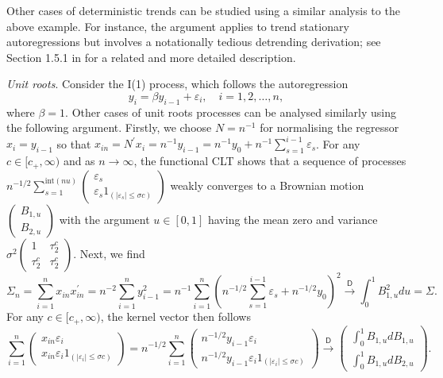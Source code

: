 \documentclass[11pt, letterpaper]{article}
\numberwithin{algorithm}{section}
\numberwithin{assumption}{section}
\numberwithin{lemma}{section}
\numberwithin{theorem}{section}
\numberwithin{corollary}{section}
\numberwithin{remark}{section}
\numberwithin{equation}{section}
\numberwithin{figure}{section}
\numberwithin{table}{section}
\begin{document}
Other cases of deterministic trends can be studied using a similar analysis to the above example. For instance, the argument applies to trend stationary autoregressions but involves a notationally tedious detrending derivation; see Section 1.5.1 in \cite{johansen2009analysis} for a related and more detailed description.

\emph{Unit roots}. Consider the I(1) process, which follows the autoregression
\begin{equation*}
y_{i} = \beta y_{i - 1} + \varepsilon_{i}, \quad i = 1, 2, \ldots, n,
\end{equation*}
where $\beta = 1$. Other cases of unit roots processes can be analysed similarly using the following argument. Firstly, we choose $N = n^{-1}$ for normalising the regressor $x_{i} = y_{i - 1}$ so that $x_{in} = N^{\prime} x_{i} = n^{-1} y_{i - 1} = n^{-1} y_{0} + n^{-1} \sum_{s = 1}^{i - 1} \varepsilon_{s}$. For any $c \in [c_{+}, \infty)$ and as $n \to \infty$, the functional CLT shows that a sequence of processes
$
n^{-1/2} \sum_{s = 1}^{\mathrm{int}(nu)}
\begin{pmatrix}
\varepsilon_{s} \\
\varepsilon_{s} 1_{(|\varepsilon_{s}| \le \sigma c)}
\end{pmatrix}
$
weakly converges to a Brownian motion
$
\begin{pmatrix}
B_{1, u} \\
B_{2, u}
\end{pmatrix}
$ with the argument $u \in [0, 1]$ having the mean zero and variance
$
\sigma^{2}
\begin{pmatrix}
1 & \tau_{2}^{c} \\
\tau_{2}^{c} & \tau_{2}^{c}
\end{pmatrix}
$.
Next, we find
\begin{equation*}
\Sigma_{n} = \sum_{i = 1}^{n} x_{in} x_{in}^{\prime} = n^{-2} \sum_{i = 1}^{n} y_{i - 1}^{2} = n^{-1} \sum_{i = 1}^{n} (n^{-1/2} \sum_{s = 1}^{i - 1} \varepsilon_{s} + n^{-1/2} y_{0})^{2} \overset{\mathsf{D}}{\to} \int_{0}^{1} B_{1, u}^{2} du = \Sigma.
\end{equation*}
For any $c \in [c_{+}, \infty)$, the kernel vector then follows
\begin{equation*}
\sum_{i = 1}^{n}
\begin{pmatrix}
x_{in} \varepsilon_{i} \\
x_{in} \varepsilon_{i} 1_{(|\varepsilon_{i}| \le \sigma c)}
\end{pmatrix}
=
n^{-1/2} \sum_{i = 1}^{n}
\begin{pmatrix}
n^{-1/2} y_{i - 1} \varepsilon_{i} \\
n^{-1/2} y_{i - 1}  \varepsilon_{i} 1_{(|\varepsilon_{i}| \le \sigma c)}
\end{pmatrix}
\overset{\mathsf{D}}{\to}
\begin{pmatrix}
\int_{0}^{1} B_{1, u} d B_{1, u} \\
\int_{0}^{1} B_{1, u} d B_{2, u}
\end{pmatrix}
.
\end{equation*}
\end{document}
